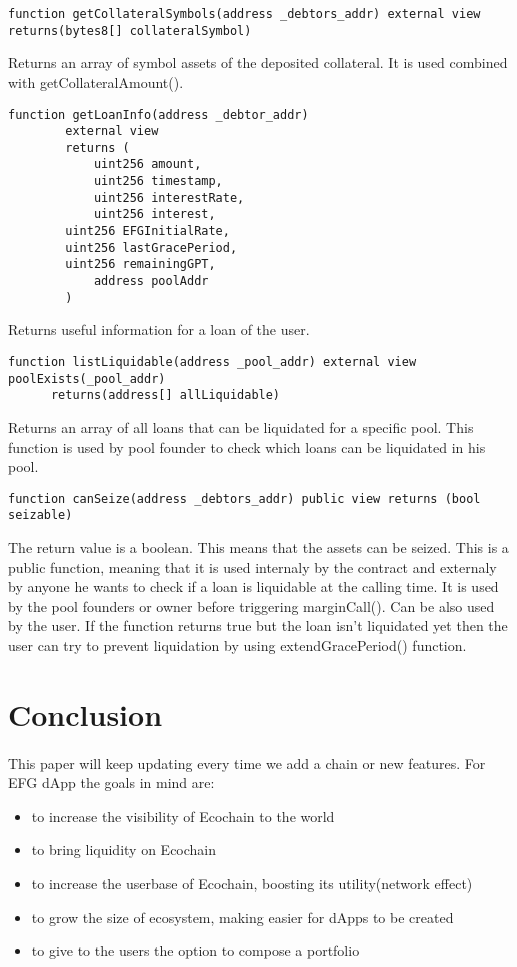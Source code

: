 \documentclass{article}
\begin{document}
\begin{lstlisting}[language=Solidity,numbers=none,escapechar=@]
 function getCollateralSymbols(address _debtors_addr) external view returns(bytes8[] collateralSymbol)
\end{lstlisting}
Returns an array of symbol assets  of the deposited collateral. It is used combined with getCollateralAmount().

\begin{lstlisting}[language=Solidity,numbers=none,escapechar=@]
 function getLoanInfo(address _debtor_addr)
        external view
        returns (
            uint256 amount,
            uint256 timestamp,
            uint256 interestRate,
            uint256 interest,
	    uint256 EFGInitialRate,
	    uint256 lastGracePeriod,
	    uint256 remainingGPT,
            address poolAddr
        )
\end{lstlisting}
Returns useful information for a loan of the user.

\begin{lstlisting}[language=Solidity,numbers=none,escapechar=@]
 function listLiquidable(address _pool_addr) external view poolExists(_pool_addr)
      returns(address[] allLiquidable)
\end{lstlisting}
Returns an array of all loans that can be liquidated for a specific pool. This function is used by pool founder to check which loans can be liquidated in his pool.

\begin{lstlisting}[language=Solidity,numbers=none,escapechar=@]
 function canSeize(address _debtors_addr) public view returns (bool seizable) 
\end{lstlisting}
The return value is a boolean. This means that the assets can be seized. This is a public function, meaning that it is used internaly by the contract and externaly by anyone he wants to check if a loan is liquidable at the calling time. It is used by the pool founders or owner before triggering  marginCall(). Can be also used by the user. If the function returns true but the loan isn't liquidated yet then the user can try to prevent liquidation by using extendGracePeriod() function.

\section{Conclusion}
\paragraph{ }
This paper will keep updating every time we add a chain or new features. For EFG dApp the goals in mind are:
\begin{itemize}
\item to increase the visibility of Ecochain to the world
\item to bring liquidity on Ecochain
\item to increase the userbase of Ecochain, boosting its utility(network effect)
\item to grow the size of ecosystem, making easier for dApps to be created
\item to give to the users the option to compose a portfolio
\end{itemize}
\end{document}
